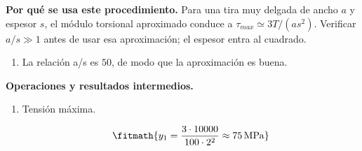 \noindent\textbf{Por qué se usa este procedimiento.} Para una tira muy delgada de ancho $a$ y espesor $s$, el módulo torsional aproximado conduce a $\tau_{max}\simeq3T/(as^2)$. Verificar $a/s\gg1$ antes de usar esa aproximación; el espesor entra al cuadrado.

\begin{enumerate}

\item La relación a/s es $50$, de modo que la aproximación es buena.

\end{enumerate}

\noindent\textbf{Operaciones y resultados intermedios.}

\begin{enumerate}

\item Tensión máxima.

\[\fitmath{y_{1}=\frac{3\cdot 10000}{100\cdot {2}^{2}}\approx 75\,\mathrm{MPa}}\]

\end{enumerate}
